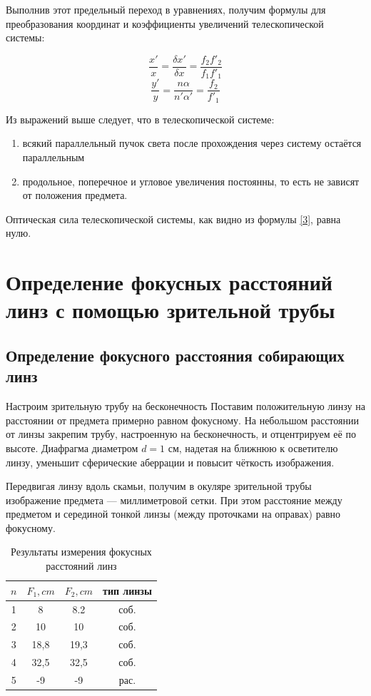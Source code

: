 \documentclass[15pt,a5paper,reqno]{article}
\begin{document}
Выполнив этот предельный переход в уравнениях, получим формулы для преобразования координат и коэффициенты увеличений телескопической системы:

\[ \frac{x'}{x} = \frac{\delta x'}{\delta x} = \frac{f_2 f'_2}{f_1 f'_1} \]
\[ \frac{y'}{y} = \frac{n \alpha}{n' \alpha'} = \frac{f_2}{f'_1} \]
  

Из выражений выше следует, что в телескопической системе:
\begin{enumerate}
    \item всякий параллельный пучок света после прохождения через систему остаётся параллельным
    \item продольное, поперечное и угловое увеличения постоянны, то есть не зависят от положения предмета.
\end{enumerate}

Оптическая сила телескопической системы, как видно из формулы \ref{3}, равна нулю.


\section{Определение фокусных расстояний линз с помощью зрительной трубы}
\subsection{Определение фокусного расстояния собирающих линз}


Настроим зрительную трубу на бесконечность
Поставим положительную линзу на расстоянии от предмета примерно равном фокусному. На небольшом расстоянии от линзы закрепим трубу, настроенную на бесконечность,
и отцентрируем её по высоте. Диафрагма диаметром $d = 1$ см, надетая на ближнюю к осветителю линзу, уменьшит сферические аберрации и повысит чёткость изображения.

Передвигая линзу вдоль скамьи, получим в окуляре зрительной трубы изображение предмета — миллиметровой сетки. При этом расстояние между предметом и серединой тонкой линзы (между проточками на оправах) равно фокусному.

    \begin{table}[h!]
        \centering
            \begin{tabular}{| c | c | c | c |}

                \hline
                    $n$ & $F_1, cm$ & $F_2, cm$ &  тип линзы\\
                \hline
                    1 & 8 & 8.2 & соб. \\
                \hline
                    2 & 10 & 10 & соб.\\
                \hline
                    3 & 18,8 & 19,3  & соб. \\
                \hline
                    4 & 32,5 & 32,5 & соб. \\
                \hline
                    5 & -9 & -9 &  рас.\\
                \hline
                \end{tabular}
        \caption{Результаты измерения фокусных расстояний линз}
        \label{nu1}
    \end{table}
    
\end{document}
